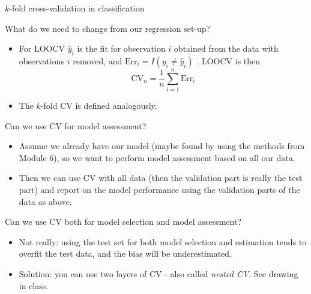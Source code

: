 \documentclass[10pt,ignorenonframetext,]{beamer}
\begin{document}
\begin{frame}

\begin{block}{\(k\)-fold cross-validation in classification}

\vspace{3mm}

What do we need to change from our regression set-up?

\vspace{3mm}

\begin{itemize}
\item
  For LOOCV \(\hat{y}_i\) is the fit for observation \(i\) obtained from
  the data with observations \(i\) removed, and
  \({\text{Err}_i}=I(y_i\neq \hat{y}_i)\) . LOOCV is then
  \[\text{CV}_{n}=\frac{1}{n} \sum_{i=1}^n {\text{Err}_i}\]
\item
  The \(k\)-fold CV is defined analogously.
\end{itemize}

\end{block}

\end{frame}

\begin{frame}

\begin{block}{Can we use CV for model assessment?}

\vspace{2mm}

\begin{itemize}
\item
  Assume we already have our model (maybe found by using the methods
  from Module 6), so we want to perform model assessment based on all
  our data.
\item
  Then we can use CV with all data (then the validation part is really
  the test part) and report on the model performance using the
  validation parts of the data as above.
\end{itemize}

\vspace{2mm}

\end{block}

\begin{block}{Can we use CV both for model selection and model
assessment?}

\vspace{2mm}

\begin{itemize}
\item
  Not really: using the test set for both model selection and estimation
  tends to overfit the test data, and the bias will be underestimated.
\item
  Solution: you can use two layers of CV - also called \emph{nested CV}.
  See drawing in class.
\end{itemize}

\end{block}

\end{frame}
\end{document}
